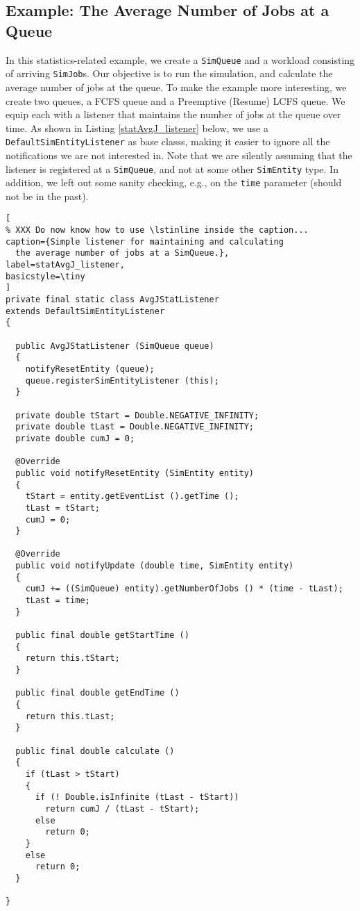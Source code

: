 \documentclass[12pt]{book}
\begin{document}
\subsection{Example: The Average Number of Jobs at a Queue}
\label{stat-intro-avgJ}

In this statistics-related example,
  we create a \lstinline|SimQueue| and
  a workload consisting of arriving \lstinline|SimJob|s.
Our objective is to run the simulation,
  and calculate the average number of jobs at the queue.
To make the example more interesting, we create two queues,
  a FCFS queue and a Preemptive (Resume) LCFS queue.
We equip each with a listener that maintains the
  number of jobs at the queue over time.
As shown in Listing \ref{statAvgJ_listener} below,
  we use a \lstinline|DefaultSimEntityListener| as
  base classs,
  making it easier to ignore all the notifications
  we are not interested in.
Note that we are silently assuming that the listener
  is registered at a \lstinline|SimQueue|,
  and not at some other \lstinline|SimEntity| type.
In addition, we left out some sanity checking,
  e.g., on the \lstinline|time| parameter
  (should not be in the past).

\begin{lstlisting}[
% XXX Do now know how to use \lstinline inside the caption...
caption={Simple listener for maintaining and calculating
  the average number of jobs at a SimQueue.},
label=statAvgJ_listener,
basicstyle=\tiny
]
private final static class AvgJStatListener
extends DefaultSimEntityListener
{
  
  public AvgJStatListener (SimQueue queue)
  {
    notifyResetEntity (queue);
    queue.registerSimEntityListener (this);
  }
    
  private double tStart = Double.NEGATIVE_INFINITY;
  private double tLast = Double.NEGATIVE_INFINITY;
  private double cumJ = 0;

  @Override
  public void notifyResetEntity (SimEntity entity)
  {
    tStart = entity.getEventList ().getTime ();
    tLast = tStart;
    cumJ = 0;
  }

  @Override
  public void notifyUpdate (double time, SimEntity entity)
  {
    cumJ += ((SimQueue) entity).getNumberOfJobs () * (time - tLast);
    tLast = time;
  }
      
  public final double getStartTime ()
  {
    return this.tStart;
  }
    
  public final double getEndTime ()
  {
    return this.tLast;
  }
    
  public final double calculate ()
  {
    if (tLast > tStart)
    {
      if (! Double.isInfinite (tLast - tStart))
        return cumJ / (tLast - tStart);
      else
        return 0;
    }
    else
      return 0;
  }

}
\end{lstlisting}
\end{document}
